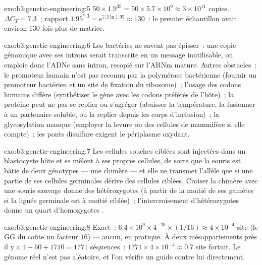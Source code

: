 \begin{solution}{exo:b3:genetic-engineering:5}
$50\times 1.9^{35} = 50\times 5.7\times 10^{9} \approx 3\times 10^{11}$
copies. $\Delta C_{T} = 7.3$~; rapport $1.95^{7.3} = e^{7.3\ln 1.95}
\approx 130$~: le premier échantillon avait environ $130$ fois plus de
matrice.
\end{solution}

\begin{solution}{exo:b3:genetic-engineering:6}
Les bactéries ne savent pas épisser~: une copie génomique avec ses
introns serait transcrite en un message inutilisable, on emploie donc
l'ADNc sans intron, recopié sur l'ARNm mature. Autres obstacles~: le
promoteur humain n'est pas reconnu par la polymérase bactérienne
(fournir un promoteur bactérien et un site de fixation du ribosome)~;
l'usage des codons humains diffère (synthétiser le gène avec les codons
préférés de l'hôte)~; la protéine peut ne pas se replier ou s'agréger
(abaisser la température, la fusionner à un partenaire soluble, ou la
replier depuis les corps d'inclusion)~; la glycosylation manque
(employer la levure ou des cellules de mammifère si elle compte)~; les
ponts disulfure exigent le périplasme oxydant.
\end{solution}

\begin{solution}{exo:b3:genetic-engineering:7}
Les cellules souches ciblées sont injectées dans un blastocyste hôte et
se mêlent à ses propres cellules, de sorte que la souris est bâtie de
deux génotypes --- une chimère --- et elle ne transmet l'allèle que si
une partie de ses cellules germinales dérive des cellules ciblées.
Croiser la chimère avec une souris sauvage donne des hétérozygotes (à
partir de la moitié de ses gamètes si la lignée germinale est à moitié
ciblée)~; l'intercroisement d'hétérozygotes donne un quart
d'homozygotes .
\end{solution}

\begin{solution}{exo:b3:genetic-engineering:8}
Exact~: $6.4\times 10^{9}\times 4^{-20}\times (1/16) \approx 4\times
10^{-4}$ site (le GG du  coûte un facteur $16$) --- aucun, en
pratique. À deux mésappariements près il y a $1 + 60 + 1710 = 1771$
séquences~: $1771\times 4\times 10^{-4} \approx 0.7$ site fortuit. Le
génome réel n'est pas aléatoire, et l'on vérifie un guide contre lui
directement.
\end{solution}

